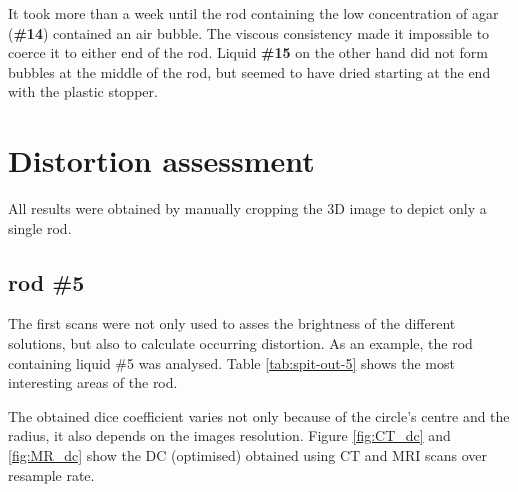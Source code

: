 It took more than a week until the rod containing the low concentration of agar (\textbf{\#14}) contained an air bubble.
The viscous consistency made it impossible to coerce it to either end of the rod.
Liquid \textbf{\#15} on the other hand did not form bubbles at the middle of the rod, but seemed to have dried starting at the end with the plastic stopper.


\section{Distortion assessment}
All results were obtained by manually cropping the 3D image to depict only a single rod.

\subsection{rod \#5}

The first scans were not only used to asses the brightness of the different solutions, but also to calculate occurring distortion.
As an example, the rod containing liquid \#5 was analysed.
Table \ref{tab:spit-out-5} shows the most interesting areas of the rod.


The obtained dice coefficient varies not only because of the circle's centre and the radius, it also depends on the images resolution.
Figure \ref{fig:CT_dc} and \ref{fig:MR_dc} show the DC (optimised) obtained using CT and MRI scans over resample rate.

